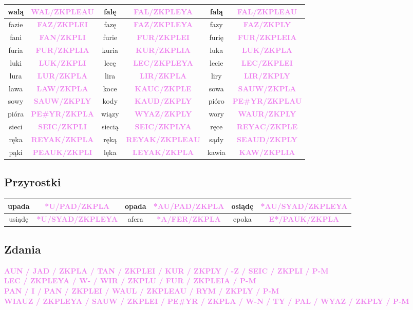 \documentclass[12p, oneside]{book}
\newcommand{\steno}[1]{\textbf{\textsf{\textcolor{violet}{ #1}}}}
\begin{document}
\begin{longtable}{|c c|c c|c c|}
	walą & \steno{WAL/ZKPLEAU} & falę & \steno{FAL/ZKPLEYA} & falą & \steno{FAL/ZKPLEAU} \\ \hline
	fazie & \steno{FAZ/ZKPLEI} & fazę & \steno{FAZ/ZKPLEYA} & fazy & \steno{FAZ/ZKPLY} \\ \hline
	fani & \steno{FAN/ZKPLI} & furie & \steno{FUR/ZKPLEI} & furię & \steno{FUR/ZKPLEIA} \\ \hline
	furia & \steno{FUR/ZKPLIA} & kuria & \steno{KUR/ZKPLIA} & luka & \steno{LUK/ZKPLA} \\ \hline
	luki & \steno{LUK/ZKPLI} & lecę & \steno{LEC/ZKPLEYA} & lecie & \steno{LEC/ZKPLEI} \\ \hline
	lura & \steno{LUR/ZKPLA} & lira & \steno{LIR/ZKPLA} & liry & \steno{LIR/ZKPLY} \\ \hline
	lawa & \steno{LAW/ZKPLA} & koce & \steno{KAUC/ZKPLE} & sowa & \steno{SAUW/ZKPLA} \\ \hline
	sowy & \steno{SAUW/ZKPLY} & kody & \steno{KAUD/ZKPLY} & pióro & \steno{PE\#YR/ZKPLAU} \\ \hline
	pióra & \steno{PE\#YR/ZKPLA} & wiązy & \steno{WYAZ/ZKPLY} & wory & \steno{WAUR/ZKPLY} \\ \hline
	sieci & \steno{SEIC/ZKPLI} & siecią & \steno{SEIC/ZKPLYA} & ręce & \steno{REYAC/ZKPLE} \\ \hline 
	ręka & \steno{REYAK/ZKPLA} & ręką & \steno{REYAK/ZKPLEAU} & sądy & \steno{SEAUD/ZKPLY} \\ \hline
	pąki & \steno{PEAUK/ZKPLI} & lęka & \steno{LEYAK/ZKPLA} & kawia & \steno{KAW/ZKPLIA} \\ \hline 
\end{longtable}

\subsection*{Przyrostki}
\begin{longtable}{|c c|c c|c c|}
	\hline
	upada & \steno{*U/PAD/ZKPLA} & opada & \steno{*AU/PAD/ZKPLA} & osiądę & \steno{*AU/SYAD/ZKPLEYA} \\ \hline
	usiądę & \steno{*U/SYAD/ZKPLEYA} & afera & \steno{*A/FER/ZKPLA} & epoka & \steno{E*/PAUK/ZKPLA} \\ \hline
\end{longtable}

\subsection*{Zdania}

\steno{AUN / JAD / ZKPLA / TAN / ZKPLEI / KUR / ZKPLY / -Z / SEIC / ZKPLI / P-M} \\
\steno{LEC / ZKPLEYA / W- / WIR / ZKPLU / FUR / ZKPLEIA / P-M} \\
\steno{PAN / I / PAN / ZKPLEI / WAUL / ZKPLEAU / RYM / ZKPLY / P-M} \\
\steno{WIAUZ / ZKPLEYA / SAUW / ZKPLEI / PE\#YR / ZKPLA / W-N / TY / PAL / WYAZ / ZKPLY / P-M}
\end{document}
